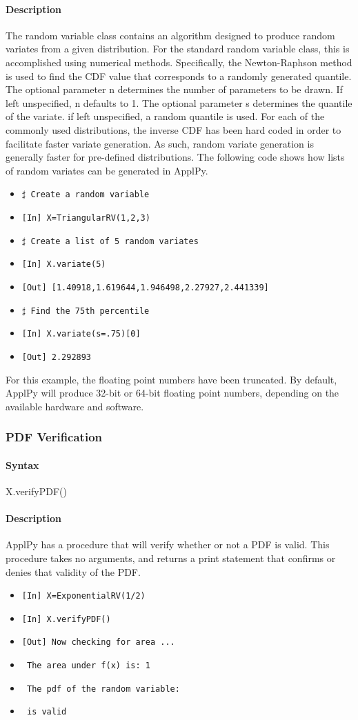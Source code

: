 \documentclass[11pt,epsfig,psfig,doublespace,singlespace]{article}
\begin{document}
\paragraph{Description} The random variable class contains an algorithm designed to produce random variates from a given distribution. For the standard random variable class, this is accomplished using numerical methods. Specifically, the Newton-Raphson method is used to find the CDF value that corresponds to a randomly generated quantile. The optional parameter n determines the number of parameters to be drawn. If left unspecified, n defaults to 1. The optional parameter s determines the quantile of the variate. if left unspecified, a random quantile is used. For each of the commonly used distributions, the inverse CDF has been hard coded in order to facilitate faster variate generation. As such, random variate generation is generally faster for pre-defined distributions. The following code shows how lists of random variates can be generated in ApplPy.
\begin{itemize}
\item \texttt{$\sharp$ Create a random variable}
\item \texttt{[In] X=TriangularRV(1,2,3)}
\item \texttt{$\sharp$ Create a list of 5 random variates}
\item \texttt{[In] X.variate(5)}
\item \texttt{[Out] [1.40918,1.619644,1.946498,2.27927,2.441339]}
\item \texttt{$\sharp$ Find the 75th percentile}
\item \texttt{[In] X.variate(s=.75)[0]}
\item \texttt{[Out] 2.292893}
\end{itemize}
For this example, the floating point numbers have been truncated. By default, ApplPy will produce 32-bit or 64-bit floating point numbers, depending on the available hardware and software.
\subsubsection{PDF Verification}
\paragraph{Syntax} X.verifyPDF()
\paragraph{Description} ApplPy has a procedure that will verify whether or not a PDF is valid. This procedure takes no arguments, and returns a print statement that confirms or denies that validity of the PDF.
\begin{itemize}
\item \texttt{[In] X=ExponentialRV(1/2)}
\item \texttt{[In] X.verifyPDF()}
\item \texttt{[Out] Now checking for area ...}
\item \texttt{      The area under f(x) is: 1}
\item \texttt{      The pdf of the random variable:}
\item \texttt{      is valid}
\end{itemize}
\end{document}
